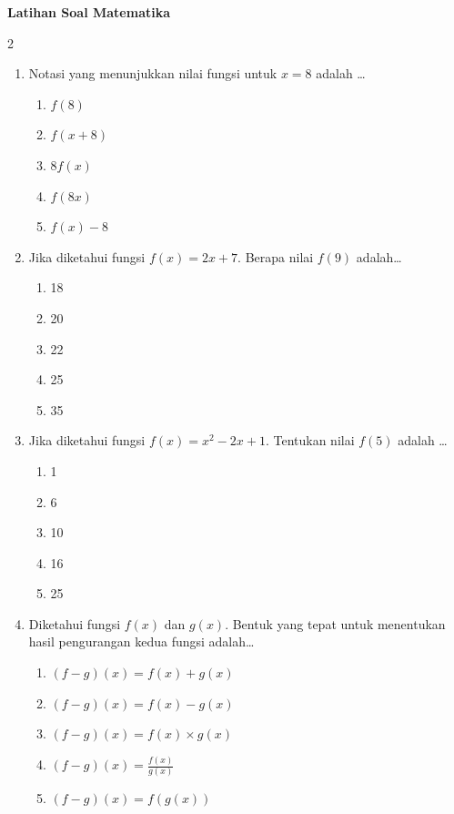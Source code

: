 \documentclass[10pt,a4paper]{article}
\begin{document}
\begin{center}
    \textbf{\Large Latihan Soal Matematika}
\end{center}
\vspace{0.3cm}

\begin{multicols}{2}

\begin{enumerate}
    \item Notasi yang menunjukkan nilai fungsi untuk $x=8$ adalah \dots
    \begin{enumerate}
        \item $f(8)$
        \item $f(x+8)$
        \item $8f(x)$
        \item $f(8x)$
        \item $f(x)-8$
    \end{enumerate}

    \item Jika diketahui fungsi $f(x)=2x+7$. Berapa nilai $f(9)$ adalah\dots
    \begin{enumerate}
        \item 18
        \item 20
        \item 22
        \item 25
        \item 35
    \end{enumerate}

    \item Jika diketahui fungsi $f(x)=x^2-2x+1$. Tentukan nilai $f(5)$ adalah \dots
    \begin{enumerate}
        \item 1
        \item 6
        \item 10
        \item 16
        \item 25
    \end{enumerate}

    \item Diketahui fungsi $f(x)$ dan $g(x)$. Bentuk yang tepat untuk menentukan hasil pengurangan kedua fungsi adalah\dots
    \begin{enumerate}
        \item $(f-g)(x)=f(x)+g(x)$
        \item $(f-g)(x)=f(x)-g(x)$
        \item $(f-g)(x)=f(x)\times g(x)$
        \item $(f-g)(x)=\frac{f(x)}{g(x)}$
        \item $(f-g)(x)=f(g(x))$
    \end{enumerate}


\end{enumerate}
\end{multicols}
\end{document}
